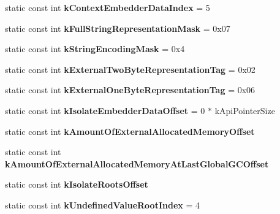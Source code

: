 \begin{DoxyCompactItemize}
\item 
static const int {\bfseries k\+Context\+Embedder\+Data\+Index} = 5\hypertarget{classv8_1_1internal_1_1Internals_afb65846499ec5f68172e4b2e8301a493}{}\label{classv8_1_1internal_1_1Internals_afb65846499ec5f68172e4b2e8301a493}

\item 
static const int {\bfseries k\+Full\+String\+Representation\+Mask} = 0x07\hypertarget{classv8_1_1internal_1_1Internals_a5c39a86b30463928ea719def66916507}{}\label{classv8_1_1internal_1_1Internals_a5c39a86b30463928ea719def66916507}

\item 
static const int {\bfseries k\+String\+Encoding\+Mask} = 0x4\hypertarget{classv8_1_1internal_1_1Internals_a1927ac3def13a57e03025e62ca46d1c5}{}\label{classv8_1_1internal_1_1Internals_a1927ac3def13a57e03025e62ca46d1c5}

\item 
static const int {\bfseries k\+External\+Two\+Byte\+Representation\+Tag} = 0x02\hypertarget{classv8_1_1internal_1_1Internals_a73faf917416d2519b65c7255e77a74ce}{}\label{classv8_1_1internal_1_1Internals_a73faf917416d2519b65c7255e77a74ce}

\item 
static const int {\bfseries k\+External\+One\+Byte\+Representation\+Tag} = 0x06\hypertarget{classv8_1_1internal_1_1Internals_ac789a0a139ccbacec0c5fb2d79427305}{}\label{classv8_1_1internal_1_1Internals_ac789a0a139ccbacec0c5fb2d79427305}

\item 
static const int {\bfseries k\+Isolate\+Embedder\+Data\+Offset} = 0 $\ast$ k\+Api\+Pointer\+Size\hypertarget{classv8_1_1internal_1_1Internals_ad722bf4760df09958cd1062db4a5524c}{}\label{classv8_1_1internal_1_1Internals_ad722bf4760df09958cd1062db4a5524c}

\item 
static const int {\bfseries k\+Amount\+Of\+External\+Allocated\+Memory\+Offset}
\item 
static const int {\bfseries k\+Amount\+Of\+External\+Allocated\+Memory\+At\+Last\+Global\+G\+C\+Offset}
\item 
static const int {\bfseries k\+Isolate\+Roots\+Offset}
\item 
static const int {\bfseries k\+Undefined\+Value\+Root\+Index} = 4\hypertarget{classv8_1_1internal_1_1Internals_a7281ff0eafed559e64613465b1a03296}{}\label{classv8_1_1internal_1_1Internals_a7281ff0eafed559e64613465b1a03296}


\end{DoxyCompactItemize}
